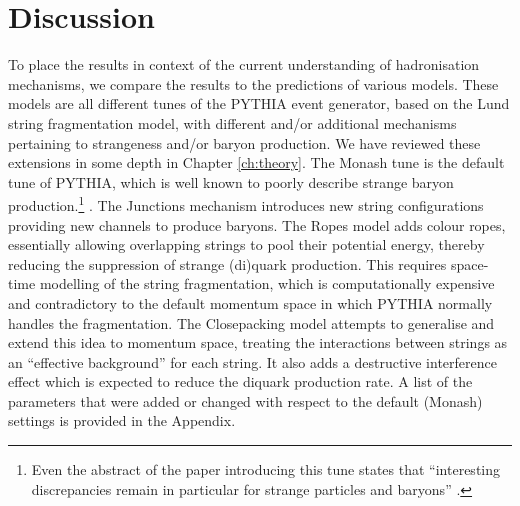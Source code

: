 \section{Discussion}

  To place the results in context of the current understanding of hadronisation mechanisms, we compare the results to the predictions  of various models. These models are all different tunes of the PYTHIA event generator, based on the Lund string fragmentation model, with different and/or additional mechanisms pertaining to strangeness and/or baryon production. We have reviewed these extensions in some depth in Chapter \ref{ch:theory}. The Monash tune \cite{MonashTune} is the default tune of PYTHIA, which is well known to poorly describe strange baryon production.\footnote{Even the abstract of the paper introducing this tune states that ``interesting discrepancies remain in particular for strange particles and baryons'' \cite{MonashTune}.} . The Junctions \cite{Junctions} mechanism introduces new string configurations providing new channels to produce baryons. The Ropes \cite{Ropes} model adds colour ropes, essentially allowing overlapping strings to pool their potential energy, thereby reducing the suppression of strange (di)quark production. This requires space-time modelling of the string fragmentation, which is computationally expensive and contradictory to the default  momentum space in which PYTHIA normally handles the fragmentation. The Closepacking \cite{Closepacking} model attempts to generalise and extend this idea to momentum space, treating the interactions between strings as an ``effective background'' for each string. It also adds a destructive interference effect which is expected to reduce the diquark production rate. A list of the parameters that were added or changed with respect to the default (Monash) settings is provided in the Appendix. 

